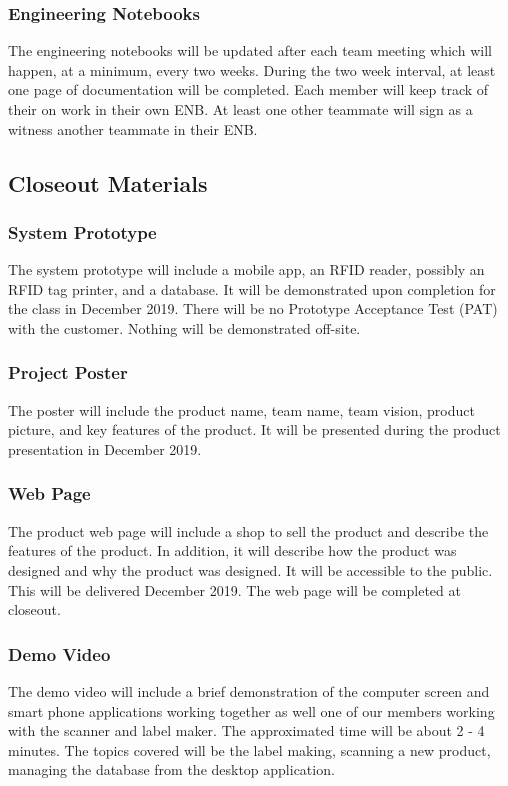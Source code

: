 \subsubsection{Engineering Notebooks}
The engineering notebooks will be updated after each team meeting which will happen, at a minimum, every two weeks. During the two week interval, at least one page of documentation will be completed. Each member will keep track of their on work in their own ENB. At least one other teammate will sign as a witness another teammate in their ENB.


\subsection{Closeout Materials}

\subsubsection{System Prototype}
The system prototype will include a mobile app, an RFID reader, possibly an RFID tag printer, and a database. It will be demonstrated upon completion for the class in December 2019. There will be no Prototype Acceptance Test (PAT) with the customer. Nothing will be demonstrated off-site.

\subsubsection{Project Poster}
The poster will include the product name, team name, team vision, product picture, and key features of the product. It will be presented during the product presentation in December 2019.

\subsubsection{Web Page}
The product web page will include a shop to sell the product and describe the features of the product. In addition, it will describe how the product was designed and why the product was designed. It will be accessible to the public. This will be delivered December 2019. The web page will be completed at closeout.

\subsubsection{Demo Video}
The demo video will include a brief demonstration of the computer screen and smart phone applications working together as well one of our members working with the scanner and label maker. The approximated time will be about 2 - 4 minutes. The topics covered will be the label making, scanning a new product, managing the database from the desktop application.

